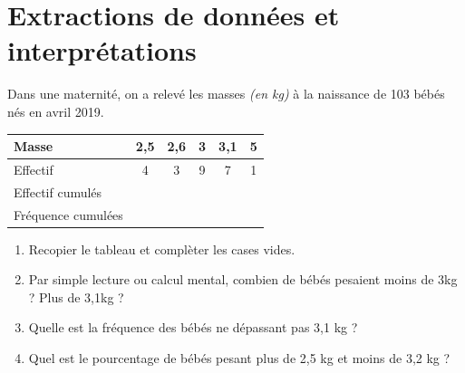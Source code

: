 \documentclass[french]{book}
\begin{document}
\section*{Extractions de données et interprétations}
Dans une maternité, on a relevé les masses \textit{(en kg)} à la naissance de 103 bébés nés en avril 2019.


\begin{center}
   \begin{tabular}{| l || c | c | c | c | c |}
     \hline
     Masse & 2,5 & 2,6 & 3 & 3,1 & 5 \\ \hline
     Effectif & 4 & 3 & 9 & 7 & 1 \\ \hline
	  Effectif cumulés & & & & & \\ \hline
	  Fréquence cumulées & & & & & \\
 
     \hline
   \end{tabular}
 \end{center}

\begin{enumerate}
\item Recopier le tableau et complèter les cases vides.
\item Par simple lecture ou calcul mental, combien de bébés pesaient moins de 3kg ? Plus de 3,1kg ? 
\item Quelle est la fréquence des bébés ne dépassant pas 3,1 kg ?
\item Quel est le pourcentage de bébés pesant plus de 2,5 kg et moins de 3,2 kg ? 
\end{enumerate}
\end{document}
